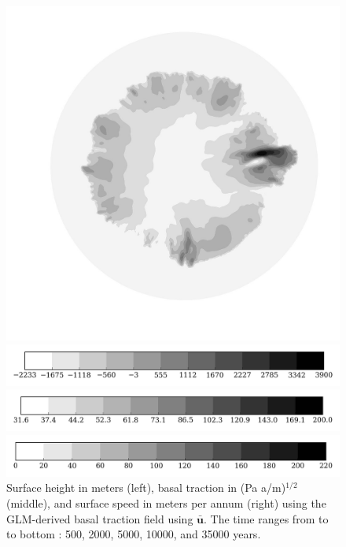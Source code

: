\begin{figure}
\begin{minipage}[b]{0.30\linewidth}
  \end{minipage}
  \quad
  \begin{minipage}[b]{0.30\linewidth}
    \includegraphics[width=1.0\textwidth]{images/EISMINT_II/Ubar/U_mag_35000.jpg}
  \end{minipage}
  
  \begin{minipage}[b]{0.30\linewidth}
    \includegraphics[width=1.0\textwidth]{images/EISMINT_II/Ubar/S_cb.jpg}
  \end{minipage}
  \quad
  \begin{minipage}[b]{0.30\linewidth}
    \includegraphics[width=1.0\textwidth]{images/EISMINT_II/Ubar/beta_cb.jpg}
  \end{minipage}
  \quad
  \begin{minipage}[b]{0.30\linewidth}
    \includegraphics[width=1.0\textwidth]{images/EISMINT_II/Ubar/U_mag_cb.jpg}
  \end{minipage}
  \caption[]{Surface height in meters (left), basal traction in (Pa a/m)$^{1/2}$ (middle), and surface speed in meters per annum (right) using the GLM-derived basal traction field using $\mathbf{\bar{u}}$.  The time ranges from to to bottom : 500, 2000, 5000, 10000, and 35000 years.}
\end{figure}


